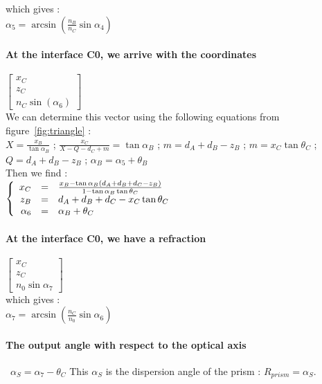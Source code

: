 which gives :\\

$\alpha_5 = \arcsin\left(\frac{n_B}{n_C}\sin\alpha_4\right) $


\paragraph*{At the interface C0, we arrive with the coordinates}

$\begin{bmatrix}x_C \\ z_C \\ n_C\sin\left(\alpha_6\right)\end{bmatrix}$\\

We can determine this vector using the following equations from figure~\ref{fig:triangle} :\\

$X = \frac{x_B}{\tan\alpha_B}$ ; $\frac{x_C}{X-Q-d_C+m} = \tan\alpha_B$ ; $m = d_A+d_B-z_B$ ; $m = x_C\tan\theta_C$ ; $Q = d_A+d_B-z_B$ ; $\alpha_B = \alpha_5+\theta_B$\\

Then we find :\\
$\left \{
   \begin{array}{r c l}
      x_C  & = & \frac{x_B-\tan\alpha_B\left(d_A+d_B+d_C-z_B\right)}{1-\tan\alpha_B\tan\theta_C} \\
      z_B   & = & d_A+d_B+d_C-x_C\tan\theta_C \\
      \alpha_6 & = & \alpha_B+\theta_C
   \end{array}
\right.$

\paragraph*{At the interface C0, we have a refraction}
$\begin{bmatrix}x_C \\ z_C \\ n_0\sin\alpha_7\end{bmatrix}$\\

which gives :\\

$\alpha_7 = \arcsin\left(\frac{n_C}{n_0}\sin\alpha_6\right) $\\

\paragraph*{The output angle with respect to the optical axis}\
$\alpha_S = \alpha_7-\theta_C$
This $\alpha_S$ is the dispersion angle of the prism : $R_{prism} = \alpha_S$.





